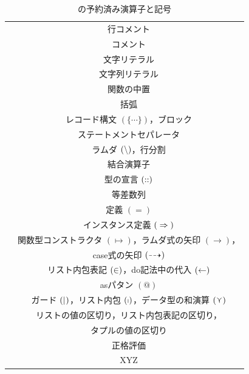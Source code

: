 \documentclass[a5paper,twoside,fleqn,draft]{jsbook}
\begin{document}
\begin{table}
\caption{\haskell の予約済み演算子と記号}
\label{tab:reserved-symbols}
\begin{center}
\begin{tabular}{||c|c||}
\hline
\code{--}&行コメント\\
\code{\{-} \code{-\}}&コメント\\
\hline
\code{'}&文字リテラル\\
\code{"}&文字列リテラル\\%
\code{`}&関数の中置\\
\code{(} \code{)}&括弧\\
\code{\{} \code{\}}&レコード構文 $(\{\dotsb\})$，ブロック\\
\code{;}&ステートメントセパレータ\\
\hline
\code{\textbackslash}&ラムダ $(\operatorname{\backslash})$，行分割\\
\code{:}&結合演算子\\
\code{::}&型の宣言 $(\operatorname{{:\!:}})$\\
\code{..}&等差数列\\
\code{=}&定義 $(=)$\\
\code{=>}&インスタンス定義 $(\operatorname{\;\Rightarrow\;})$\\
\code{->}&関数型コンストラクタ $(\mapsto)$，ラムダ式の矢印 $(\rightarrow)$，\\
&case式の矢印 $(\operatorname{\dashrightarrow})$\\
\code{<-}&リスト内包表記 $(\operatorname{\in})$，do記法中の代入 $(\operatorname{\leftarrow})$\\
\code{@}&asパタン $(@)$\\
\code{|}&ガード $(\mathop{\mid_{}})$，リスト内包 $(\operatorname{\shortmid})$，データ型の和演算 $(\operatorname{\curlyvee})$\\
\code{,}&リストの値の区切り，リスト内包表記の区切り，\\
&タプルの値の区切り\\
\hline
\code{!}&正格評価\\
\code{\textasciitilde}&XYZ\\
\hline
\end{tabular}
\end{center}
\end{table}
\end{document}
